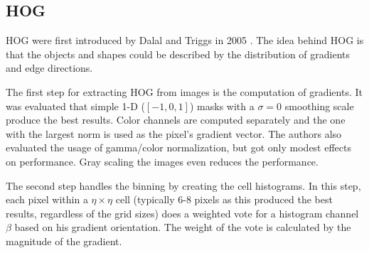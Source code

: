 \subsection{\acf*{HOG}}
\label{sec:hog}

\ac{HOG} were first introduced by Dalal and Triggs in 2005 \cite{Dalal2005}. The idea behind \ac{HOG} is that the objects and shapes could be described by the distribution of gradients and edge directions.

The first step for extracting \ac{HOG} from images is the computation of gradients. It was evaluated that simple 1-D ($[-1, 0, 1]$) masks with a $\sigma = 0$ smoothing scale produce the best results. Color channels are computed separately and the one with the largest norm is used as the pixel's gradient vector. The authors also evaluated the usage of gamma/color normalization, but got only modest effects on performance. Gray scaling the images even reduces the performance.

The second step handles the binning by creating the cell histograms. In this step, each pixel within a $\eta \times \eta$ cell (typically 6-8 pixels as this produced the best results, regardless of the grid sizes) does a weighted vote for a histogram channel $\beta$ based on his gradient orientation. The weight of the vote is calculated by the magnitude of the gradient.

